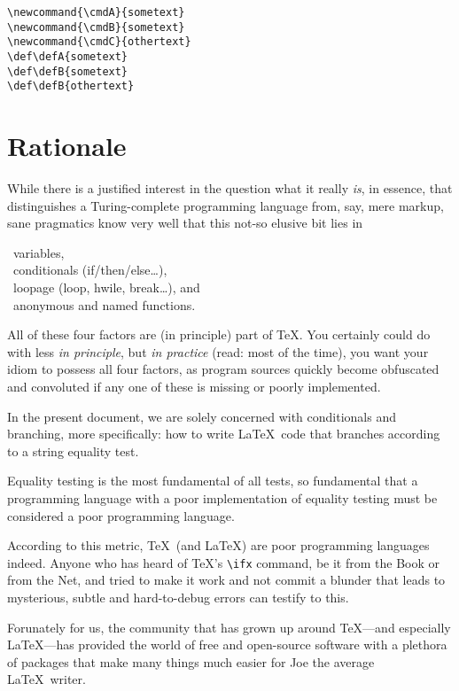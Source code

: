 \documentclass[a5paper,10pt,german]{memoir}
\newcommand{\cmdA}{sometext}
\newcommand{\cmdB}{sometext}
\newcommand{\cmdC}{othertext}
\def\defA{sometext}
\def\defB{sometext}
\begin{document}
\newpage

\verb#\newcommand{\cmdA}{sometext}#\\
\verb#\newcommand{\cmdB}{sometext}#\\
\verb#\newcommand{\cmdC}{othertext}#\\
\verb#\def\defA{sometext}#\\
\verb#\def\defB{sometext}#\\
\verb#\def\defB{othertext}#\\

\newpage
\section{Rationale}

While there is a justified interest in the question what it really {\em is}, in essence, that distinguishes a
Turing-complete programming language from, say, mere markup, sane pragmatics know very well that this
not-so elusive bit lies in

\RIGHTarrow~variables,\\
\RIGHTarrow~conditionals (if/then/else\ldots),\\
\RIGHTarrow~loopage (loop, hwile, break\ldots), and\\
\RIGHTarrow~anonymous and named functions.

All of these four factors are (in principle) part of \TeX. You certainly could do with less {\em in
principle}, but {\em in practice} (read: most of the time), you want your idiom to possess all four factors,
as program sources quickly become obfuscated and convoluted if any one of these is missing or poorly
implemented.

In the present document, we are solely concerned with conditionals and branching, more specifically: how
to write \LaTeX\ code that branches according to a string equality test.

Equality testing is the most fundamental of all tests, so fundamental that a programming language with a
poor implementation of equality testing must be considered a poor programming language.

According to this metric, \TeX\ (and \LaTeX) are poor programming languages indeed. Anyone who has heard
of \TeX's \verb#\ifx# command, be it from the Book or from the Net, and tried to make it work and not
commit a blunder that leads to mysterious, subtle and hard-to-debug errors can testify to this.

Forunately for us, the community that has grown up around \TeX—and especially \LaTeX—has provided the world
of free and open-source software with a plethora of packages that make many things much easier for Joe
the average \LaTeX\ writer.
\end{document}
